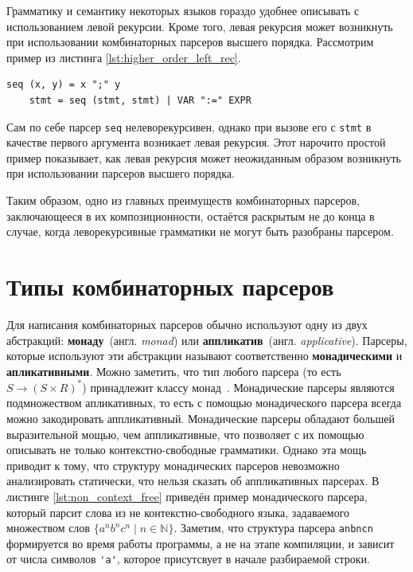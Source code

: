 \documentclass[times]{itmo-student-thesis}
\begin{document}
Грамматику и семантику некоторых языков гораздо удобнее описывать с использованием левой рекурсии. Кроме того,
левая рекурсия может возникнуть при использовании комбинаторных парсеров высшего порядка. Рассмотрим пример из листинга 
\ref{lst:higher_order_left_rec}.

\begin{lstlisting}[float=!h,caption={Возникновение левой рекурсии},label={lst:higher_order_left_rec}]
    seq (x, y) = x ";" y
    stmt = seq (stmt, stmt) | VAR ":=" EXPR
\end{lstlisting}

Сам по себе парсер \lstinline{seq} нелеворекурсивен, однако при вызове его с \lstinline{stmt} в качестве первого аргумента возникает левая рекурсия.
Этот нарочито простой пример показывает, как левая рекурсия может неожиданным образом возникнуть при использовании
парсеров высшего порядка.

Таким образом, одно из главных преимуществ комбинаторных парсеров, заключающееся в их композиционности, остаётся
раскрытым не до конца в случае, когда леворекурсивные грамматики не могут быть разобраны парсером.

\section{Типы комбинаторных парсеров}\label{sec:parser_combinators_types}

Для написания комбинаторных парсеров обычно используют одну из двух абстракций: \textbf{монаду}~(англ.
\textit{monad})	или \textbf{аппликатив}~(англ. \textit{applicative}). Парсеры, которые используют эти
абстракции называют соответственно  \textbf{монадическими} и \textbf{апликативными}. Можно заметить, что тип любого
парсера (то есть $S \rightarrow (S \times R)^*$) принадлежит классу монад~\cite{hutton_monadic_1999}. Монадические парсеры
являются подмножеством апликативных, то есть с помощью монадического парсера всегда можно закодировать аппликативный.
Монадические парсеры обладают большей выразительной мощью, чем аппликативные, что позволяет с их помощью описывать не
только	    контекстно-свободные грамматики. Однако эта мощь приводит к тому, что структуру монадических парсеров
невозможно анализировать статически, что нельзя сказать об аппликативных парсерах. В листинге \ref{lst:non_context_free}
приведён пример монадического парсера,	который парсит слова из не контекстно-свободного языка, задаваемого множеством
слов $\{a^nb^nc^n \mid n \in \mathbb{N}\}$. Заметим, что структура парсера \lstinline{anbncn} формируется во время работы
программы, а не на этапе компиляции, и зависит от числа символов \lstinline{'a'}, которое присутсвует в
начале разбираемой строки.
\end{document}
